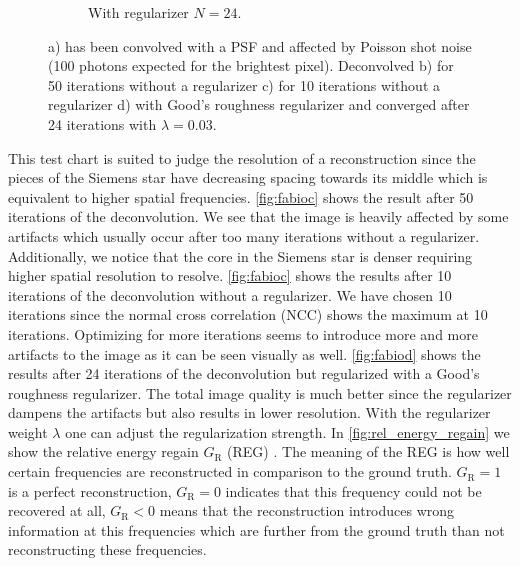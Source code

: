 \documentclass{juliacon}
\begin{document}
\begin{figure}[h]
\begin{subfigure}[b]{.25\textwidth}
                \caption{With regularizer $N=24$.}
                \label{fig:fabiod}
            \end{subfigure}%
            \caption{a) has been convolved with a PSF and affected by Poisson shot noise (100 photons expected for the brightest pixel). 
                        Deconvolved b) for 50 iterations without a regularizer c) for 10 iterations without a regularizer d) with Good's roughness regularizer and 
                            converged after 24 iterations with $\lambda=0.03$.}
            \label{fig:image}
        \end{figure}

        This test chart is suited to judge the resolution of a reconstruction since the pieces of the Siemens star
        have decreasing spacing towards its middle which is equivalent to higher spatial frequencies.
        \autoref{fig:fabioc} shows the result after 50 iterations of the deconvolution. 
        We see that the image is heavily affected by some artifacts which usually occur after too many iterations without a regularizer.
        Additionally, we notice that the core in the Siemens star is denser 
        requiring higher spatial resolution to resolve. 
        \autoref{fig:fabioc} shows the results after 10 iterations of the deconvolution without a regularizer.
        We have chosen 10 iterations since the normal cross correlation (NCC) shows the maximum at 10 iterations.
        Optimizing for more iterations seems to introduce more and more artifacts to the image as it can be seen visually as well.
        \autoref{fig:fabiod} shows the results after 24 iterations of the deconvolution but regularized with a Good's roughness regularizer.
        The total image quality is much better since the regularizer dampens the artifacts but also results in lower
        resolution. With the regularizer weight $\lambda$ one can adjust the regularization strength.
        In \autoref{fig:rel_energy_regain} we show the relative energy regain $G_\textrm{R}$ (REG) \cite{rel_energy_regain}.
        The meaning of the REG is how well certain frequencies are reconstructed in comparison
        to the ground truth. $G_\textrm{R} = 1$ is a perfect reconstruction, $G_\textrm{R} = 0$ indicates that 
        this frequency could not be recovered at all, $G_\textrm{R} < 0$ means that the reconstruction introduces 
        wrong information at this frequencies
        which are further from the ground truth than not reconstructing these frequencies. 
\end{document}
